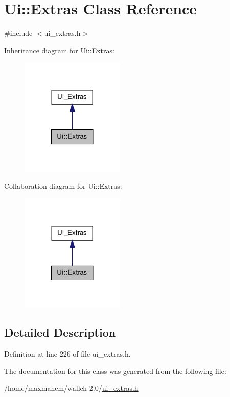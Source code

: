 \hypertarget{classUi_1_1Extras}{
\section{Ui::Extras Class Reference}
\label{classUi_1_1Extras}
}


{\ttfamily \#include $<$ui\_\-extras.h$>$}



Inheritance diagram for Ui::Extras:
\nopagebreak
\begin{figure}[H]
\begin{center}
\leavevmode
\includegraphics[width=140pt]{classUi_1_1Extras__inherit__graph}
\end{center}
\end{figure}


Collaboration diagram for Ui::Extras:
\nopagebreak
\begin{figure}[H]
\begin{center}
\leavevmode
\includegraphics[width=140pt]{classUi_1_1Extras__coll__graph}
\end{center}
\end{figure}


\subsection{Detailed Description}


Definition at line 226 of file ui\_\-extras.h.



The documentation for this class was generated from the following file:\begin{DoxyCompactItemize}
\item 
/home/maxmahem/wallch-\/2.0/\hyperlink{ui__extras_8h}{ui\_\-extras.h}\end{DoxyCompactItemize}
